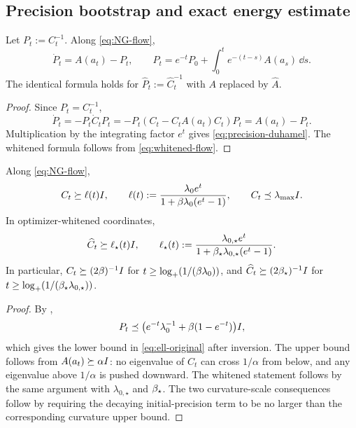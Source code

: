 \subsection{Precision bootstrap and exact energy estimate}

\begin{lemma}
\label{lem:precision-duhamel}
Let $P_t:=C_t^{-1}$.  Along \eqref{eq:NG-flow},
\begin{equation}
\label{eq:precision-duhamel}
    \dot P_t=A(a_t)-P_t,
    \qquad
    P_t=e^{-t}P_0+\int_0^te^{-(t-s)}A(a_s)\,\dd s.
\end{equation}
The identical formula holds for
$\widehat P_t:=\widehat C_t^{-1}$ with $A$ replaced by $\widehat A$.
\end{lemma}

\begin{proof}
Since $P_t=C_t^{-1}$,
\[
    \dot P_t=-P_t\dot C_tP_t
    =-P_t(C_t-C_tA(a_t)C_t)P_t
    =A(a_t)-P_t.
\]
Multiplication by the integrating factor $e^t$ gives \eqref{eq:precision-duhamel}.  The whitened
formula follows from \eqref{eq:whitened-flow}.
\end{proof}

\begin{lemma}
\label{lem:cont-cov}
Along \eqref{eq:NG-flow},
\begin{equation}
\label{eq:ell-original}
    C_t\succeq\ell(t)I,
    \qquad
    \ell(t):=\frac{\lambda_0e^t}{1+\beta\lambda_0(e^t-1)},
    \qquad
    C_t\preceq\lambda_{\max}I.
\end{equation}
In optimizer-whitened coordinates,
\begin{equation}
\label{eq:ell-star}
    \widehat C_t\succeq\ell_\star(t)I,
    \qquad
    \ell_\star(t)
    :=\frac{\lambda_{0,\star}e^t}{1+\beta_\star\lambda_{0,\star}(e^t-1)}.
\end{equation}
In particular,
$C_t\succeq(2\beta)^{-1}I$ for
$t\geq\log_+(1/(\beta\lambda_0))$, and
$\widehat C_t\succeq(2\beta_\star)^{-1}I$ for
$t\geq\log_+(1/(\beta_\star\lambda_{0,\star}))$.
\end{lemma}

\begin{proof}
By ,
\[
    P_t\preceq
    \bigl(e^{-t}\lambda_0^{-1}+\beta(1-e^{-t})\bigr)I,
\]
which gives the lower bound in \eqref{eq:ell-original} after inversion.  The upper bound follows
from $A(a_t)\succeq\alpha I$: no eigenvalue of $C_t$ can cross $1/\alpha$ from below, and any
eigenvalue above $1/\alpha$ is pushed downward.  The whitened statement follows by the same
argument with $\lambda_{0,\star}$ and $\beta_\star$.  The two curvature-scale consequences follow by
requiring the decaying initial-precision term to be no larger than the corresponding curvature
upper bound.
\end{proof}

